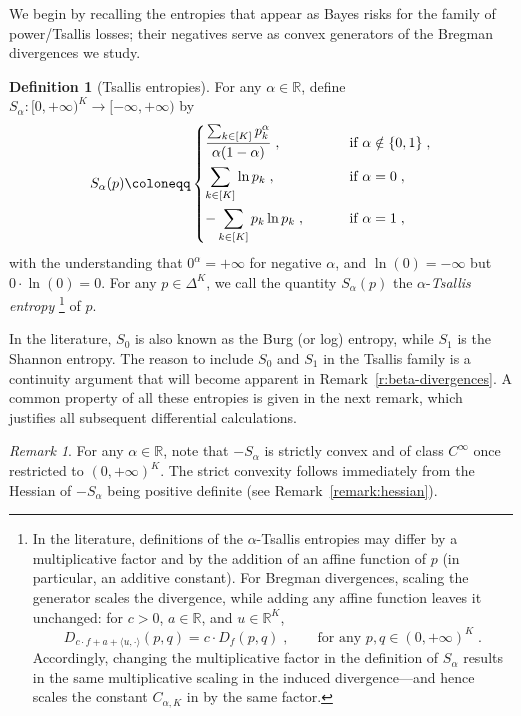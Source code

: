 \documentclass[11pt,oneside,a4paper]{article}
\newcommand{\R}{\mathbb{R}}
\newcommand{\lcb}[1]{\left\{#1\right\}}
\theoremstyle{plain}
\theoremstyle{definition}
\newtheorem{definition}[theorem]{Definition}
\theoremstyle{remark}
\newtheorem{remark}[theorem]{Remark}
\newcommand{\simplex}[1]{\Delta^{#1}}
\begin{document}
We begin by recalling the entropies that appear as Bayes risks for the family of power/Tsallis losses; their negatives serve as convex generators of the Bregman divergences we study.
\begin{definition}[Tsallis entropies]\label{def:tsallis}
For any $\alpha \in \R$, define $S_\alpha \colon [0,+\infty)^K \to [-\infty,+\infty)$ by
\begin{equation}
\label{eq:Tsallis}
    S_\alpha(p) 
\coloneqq
    \begin{cases}
    \vspace{1ex}
        \displaystyle\frac{\sum_{k\in [K]}p_k^\alpha}{\alpha(1-\alpha)}  \;,\qquad &\text{ if $\alpha \notin\lcb{0,1}$}\;,\\
    \vspace{1ex}
    \displaystyle\sum_{k \in [K]} \ln p_k \;,\qquad  &\text{ if $\alpha = 0$}\;,\\
    \displaystyle- \sum_{k \in [K]} p_k \ln p_k \;,\qquad  &\text{ if $\alpha = 1$}\;,
\end{cases}    
\end{equation}
with the understanding that $0^{\alpha} = + \infty$ for negative $\alpha$, and $\ln(0) = -\infty$ but $0 \cdot \ln(0) = 0$.
For any $p\in \simplex{K}$, we call the quantity $S_{\alpha}(p)$ the $\alpha$-\emph{Tsallis entropy}%
\footnote{
    In the literature, definitions of the $\alpha$-Tsallis entropies may differ by a multiplicative factor and by the addition of an affine function of $p$ (in particular, an additive constant).
    For Bregman divergences, scaling the generator scales the divergence, while adding any affine function leaves it unchanged: for $c>0$, $a\in\mathbb{R}$, and $u\in\mathbb{R}^K$,
    \[
    D_{c\cdot f + a + \langle u,\cdot\rangle}(p, q)=c \cdot D_f(p, q)\;,\qquad \text{for any $p,q \in (0,+\infty)^K$}\;.
    \]
    Accordingly, changing the multiplicative factor in the definition of $S_\alpha$ results in the same multiplicative scaling in the induced divergence---and hence scales the constant $C_{\alpha,K}$ in  by the same factor.
    }
of $p$.
\end{definition}
In the literature, $S_0$ is also known as the Burg (or log) entropy, while $S_1$ is the Shannon entropy.
The reason to include $S_0$ and $S_1$ in the Tsallis family is a continuity argument that will become apparent in Remark~\ref{r:beta-divergences}. A common property of all these entropies is given in the next remark, which justifies all subsequent differential calculations.
\begin{remark}
For any $\alpha \in \R$, note that $-S_\alpha$ is strictly convex and of class $C^\infty$ once restricted to $(0,+\infty)^K$. The strict convexity follows immediately from the Hessian of $-S_\alpha$ being positive definite (see Remark~\ref{remark:hessian}).
\end{remark}
\end{document}

